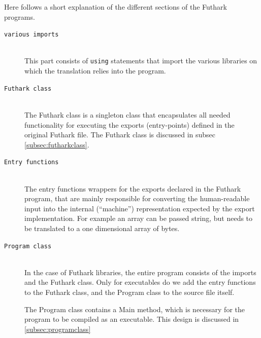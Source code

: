 Here follows a short explanation of the different sections of the Futhark
programs.
\begin{description}
\item[\texttt{various imports}] \hfill \\
  This part consists of \texttt{using} statements that import the
    various libraries on which the translation relies into the \csharp{} program.
  
\item[\texttt{Futhark class}] \hfill \\
  The Futhark class is a singleton class that encapsulates all needed functionality
    for executing the exports (entry-points) defined in the original Futhark file.
  The Futhark class is discussed in subsec \ref{subsec:futharkclass}.
  
\item[\texttt{Entry functions}] \hfill \\
  The entry functions wrappers for the exports declared in the Futhark program,
    that are mainly responsible for converting the human-readable input into
    the internal (``machine'') representation expected by the export implementation.
  For example an array can be passed string, but needs to be translated to
  a one dimensional array of bytes.

\item[\texttt{Program class}] \hfill \\
  In the case of Futhark libraries, the entire \csharp{} program consists
  of the imports and the Futhark class. Only for executables do we add the entry
  functions to the Futhark class, and the Program class to the \csharp{} source
  file itself.
 
  The Program class contains a Main method, which is necessary for the \csharp{}
  program to be compiled as an executable. This design is discussed in \ref{subsec:programclass}
\end{description}

